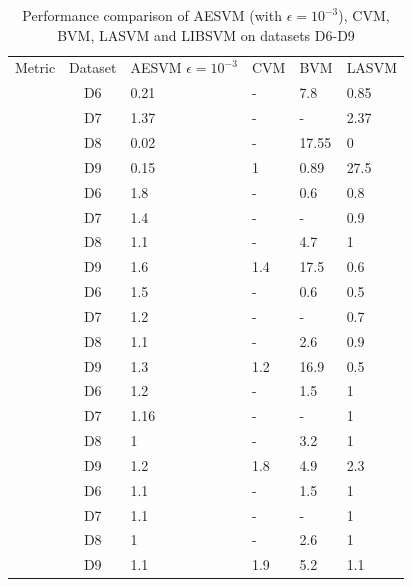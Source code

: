 \documentclass[twoside]{article}
\begin{document}
\begin{table}[h!]
\begin{center}
\begin{tabular}{|c!{\vrule width 1pt}c!{\vrule width 1pt}p{1.5cm}|l|l|l|} \hline
Metric& Dataset& AESVM $\epsilon = 10^{-3}$ & CVM & BVM & LASVM\\ 
&D6 & 0.21 & - & 7.8 & 0.85\\ 
&D7 & 1.37 & - & - & 2.37 \\ 
&D8 & 0.02 & - & 17.55 & 0  \\ 
&D9 & 0.15 & 1 & 0.89 & 27.5 \\ 
&D6 & 1.8 & - & 0.6 & 0.8\\ 
&D7 & 1.4  & - & - & 0.9\\ 
&D8 & 1.1 & - & 4.7 & 1 \\ 
&D9 & 1.6 & 1.4 & 17.5 & 0.6 \\ 
&D6 & 1.5 & - & 0.6 & 0.5\\ 
&D7 & 1.2 & - & - & 0.7\\ 
&D8 & 1.1 & - & 2.6 & 0.9 \\ 
&D9 & 1.3 & 1.2 & 16.9 & 0.5 \\ 
&D6 & 1.2 & - & 1.5 & 1\\ 
&D7 & 1.16 & - & - & 1\\ 
&D8 & 1 & - & 3.2 & 1 \\ 
&D9 & 1.2 & 1.8 & 4.9 & 2.3 \\ 
&D6 & 1.1 & - & 1.5 & 1\\ 
&D7 & 1.1 & - & - & 1\\ 
&D8 & 1 & - & 2.6 & 1 \\ 
&D9 & 1.1 & 1.9 & 5.2 & 1.1 \\ \hline
\end{tabular}
\end{center}
\caption{Performance comparison of AESVM (with $\epsilon = 10^{-3}$), CVM, BVM, LASVM and LIBSVM on datasets D6-D9}
\label{tb:testing3}
\end{table}
\end{document}
